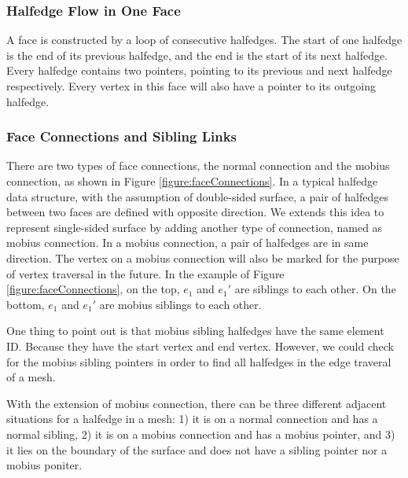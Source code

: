\documentclass[12pt]{article}
\begin{document}
\subsubsection{Halfedge Flow in One Face}
A face is constructed by a loop of consecutive halfedges. The start of one halfedge is the end of its previous halfedge, and the end is the start of its next halfedge. Every halfedge contains two pointers, pointing to its previous and next halfedge respectively. Every vertex in this face will also have a pointer to its outgoing halfedge.

\subsubsection{Face Connections and Sibling Links}

There are two types of face connections, the normal connection and the mobius connection, as shown in Figure \ref{figure:faceConnections}. In a typical halfedge data structure, with the assumption of double-sided surface, a pair of halfedges between two faces are defined with opposite direction. We extends this idea to represent single-sided surface by adding another type of connection, named as mobius connection. In a mobius connection, a pair of halfedges are in same direction. The vertex on a mobius connection will also be marked for the purpose of vertex traversal in the future. In the example of Figure \ref{figure:faceConnections}, on the top, $e_1$ and $e_1'$ are siblings to each other. On the bottom, $e_1$ and $e_1'$ are mobius siblings to each other. 

One thing to point out is that mobius sibling halfedges have the same element ID. Because they have the start vertex and end vertex. However, we could check for the mobius sibling pointers in order to find all halfedges in the edge traveral of a mesh.

With the extension of mobius connection, there can be three different adjacent situations for a halfedge in a mesh: 1) it is on a normal connection and has a normal sibling, 2) it is on a mobius connection and has a mobius pointer, and 3) it lies on the boundary of the surface and does not have a sibling pointer nor a mobius poniter.
\end{document}
